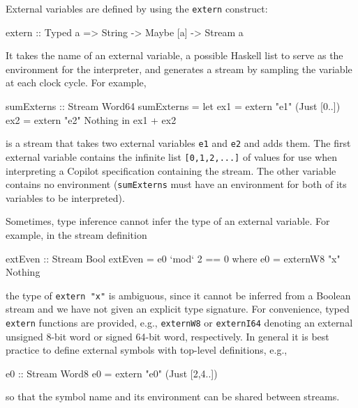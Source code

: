 \documentclass[]{article}
\theoremstyle{example}
\begin{document}
External variables are defined by using the {\tt extern} construct:
%
\begin{code}
extern :: Typed a => String -> Maybe [a] -> Stream a
\end{code}
%
\noindent
It takes the name of an external variable, a possible Haskell list to serve as
the environment for the interpreter, and generates a stream by sampling the
variable at each clock cycle.  For example,
%
\begin{code}
sumExterns :: Stream Word64
sumExterns = let ex1 = extern "e1" (Just [0..])
                 ex2 = extern "e2" Nothing
             in  ex1 + ex2
\end{code}
%
is a stream that takes two external variables {\tt e1} and {\tt e2} and adds
them.  The first external variable contains the infinite list {\tt [0,1,2,...]}
of values for use when interpreting a Copilot specification containing the
stream.  The other variable contains no environment ({\tt sumExterns} must have
an environment for both of its variables to be interpreted).

Sometimes, type inference cannot infer the type of an external variable.  For
example, in the stream definition
%
\begin{code}
extEven :: Stream Bool
extEven = e0 `mod` 2 == 0
  where e0 = externW8 "x" Nothing 
\end{code}
%
\noindent
the type of {\tt extern "x"} is ambiguous, since it cannot be inferred from a
Boolean stream and we have not given an explicit type signature.  For
convenience, typed {\tt extern} functions are provided, e.g., {\tt externW8} or
{\tt externI64} denoting an external unsigned 8-bit word or signed 64-bit word,
respectively.  In general it is best practice to define external symbols with
top-level definitions, e.g.,
%
\begin{code}
e0 :: Stream Word8
e0 = extern  "e0" (Just [2,4..])
\end{code}

\noindent
so that the symbol name and its environment can be shared between streams.
\end{document}
